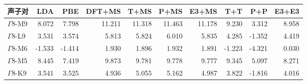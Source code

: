 \begin{tabular}{lrrrrrrrrr}
\toprule
声子对 & LDA & PBE & DFT+MS & T+MS & P+MS & E3+MS & T+T & P+P & E3+E3 \\
\midrule
$\Gamma$8-M9 & 8.072 & 7.798 & 11.211 & 11.318 & 11.463 & 11.178 & 9.230 & 3.312 & 8.958 \\
$\Gamma$8-L9 & 3.531 & 3.574 & 5.813 & 5.824 & 6.010 & 5.835 & 4.285 & -1.352 & 4.419 \\
$\Gamma$8-M6 & -1.533 & -1.414 & 1.930 & 1.896 & 1.932 & 1.891 & -1.223 & -4.321 & 0.030 \\
$\Gamma$8-M5 & 8.445 & 7.419 & 9.873 & 9.781 & 9.778 & 9.777 & 9.345 & 5.097 & 8.271 \\
$\Gamma$8-K9 & 3.541 & 3.525 & 4.936 & 5.055 & 5.162 & 4.987 & 3.822 & -1.816 & 4.016 \\
\bottomrule
\end{tabular}
